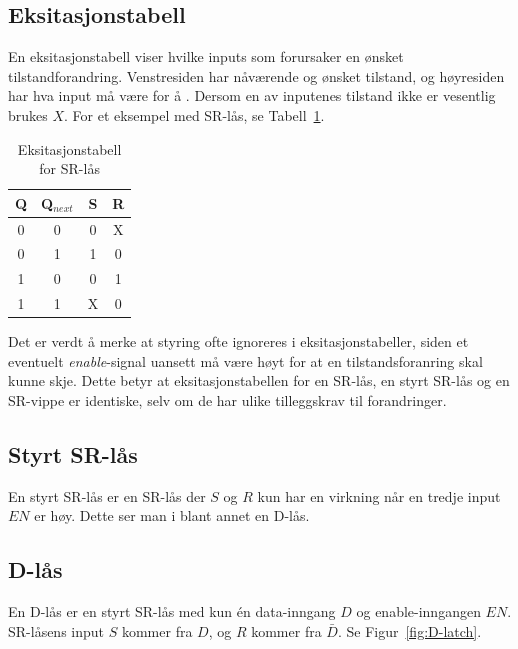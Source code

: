 \documentclass[12pt,a4paper,norsk]{article}
\begin{document}
\subsection{Eksitasjonstabell}
En eksitasjonstabell viser hvilke inputs som forursaker en ønsket
tilstandforandring. Venstresiden har nåværende og ønsket tilstand, og høyresiden
har hva input må være for å . Dersom en av inputenes tilstand ikke er vesentlig brukes $X$. For
et eksempel med SR-lås, se Tabell~\ref{tab:SR_latch_eksit}.

\begin{table}[hbt!]
  \centering
  \begin{tabular}{cc|cc}
    \toprule
    Q & Q$_{next}$ & S & R \\
    \midrule
    0 & 0 & 0 & X \\
    0 & 1 & 1 & 0 \\
    1 & 0 & 0 & 1 \\
    1 & 1 & X & 0
  \end{tabular}
  \caption{Eksitasjonstabell for SR-lås\label{tab:SR_latch_eksit}}
\end{table}

Det er verdt å merke at styring ofte ignoreres i eksitasjonstabeller, siden et
eventuelt \textit{enable}-signal uansett må være høyt for at en
tilstandsforanring skal kunne skje. Dette betyr at eksitasjonstabellen for en
SR-lås, en styrt SR-lås og en SR-vippe er identiske, selv om de har ulike
tilleggskrav til forandringer. 

\subsection{Styrt SR-lås}
En styrt SR-lås er en SR-lås der $S$ og $R$ kun har en virkning når en tredje
input $EN$ er høy. Dette ser man i blant annet en D-lås.

\subsection{D-lås}
En D-lås er en styrt SR-lås med kun én data-inngang $D$ og enable-inngangen
$EN$. SR-låsens input $S$ kommer fra $D$, og $R$ kommer
fra $\bar{D}$. Se Figur~\ref{fig:D-latch}.
\end{document}
